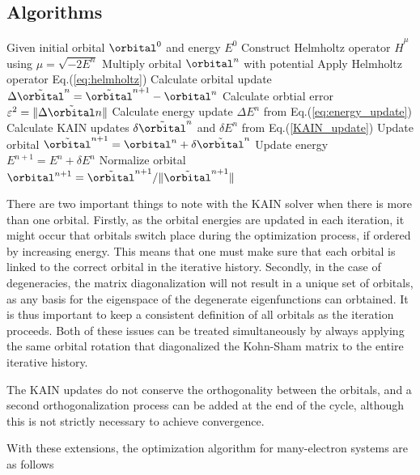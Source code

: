 \subsection{Algorithms}
\begin{algorithm}
\begin{algorithmic}[1]
\STATE Given initial orbital $\orbital^0$ and energy $E^0$
    \STATE Construct Helmholtz operator $\hat{H}^{\mu}$ using $\mu = \sqrt{-2E^n}$
    \STATE Multiply orbital $\orbital^n$ with potential
    \STATE Apply Helmholtz operator Eq.(\ref{eq:helmholtz})
    \STATE Calculate orbital update $\Delta\tilde{\orbital}^n = \tilde{\orbital}^{n+1}-\orbital^n$
    \STATE Calculate orbtial error $\varepsilon^2 = \|\Delta\tilde{\orbital}n\|$ 
    \STATE Calculate energy update $\Delta{E}^n$ from Eq.(\ref{eq:energy_update})
    \STATE Calculate KAIN updates $\delta\tilde{\orbital}^n$ and $\delta{E}^n$ from Eq.(\ref{KAIN_update}) 
    \STATE Update orbital $\tilde{\orbital}^{n+1} = \orbital^n + \delta\tilde{\orbital}^n$
    \STATE Update energy $E^{n+1} = E^n+\delta{E}^n$
    \STATE Normalize orbital $\orbital^{n+1} = \tilde{\orbital}^{n+1}/\|\tilde{\orbital}^{n+1}\|$
\ENDWHILE
\end{algorithmic}
\end{algorithm}

There are two important things to note with the KAIN solver when there is more 
than one orbital. Firstly, as the orbital energies are updated in each iteration, 
it might occur that orbitals switch place during the optimization process, if 
ordered by increasing energy. This means that one must make sure that each 
orbital is linked to the correct orbital in the iterative history. Secondly, 
in the case of degeneracies, the matrix diagonalization will not result in a 
unique set of orbitals, as any basis for the eigenspace of the degenerate 
eigenfunctions can orbtained. It is thus important to keep a consistent 
definition of all orbitals as the iteration proceeds. Both of these issues 
can be treated simultaneously by always applying the same orbital rotation 
that diagonalized the Kohn-Sham matrix to the entire iterative history.

The KAIN updates do not conserve the orthogonality between the orbitals, 
and a second orthogonalization process can be added at the end of the cycle, 
although this is not strictly necessary to achieve convergence.
 
With these extensions, the optimization algorithm for many-electron systems 
are as follows 

